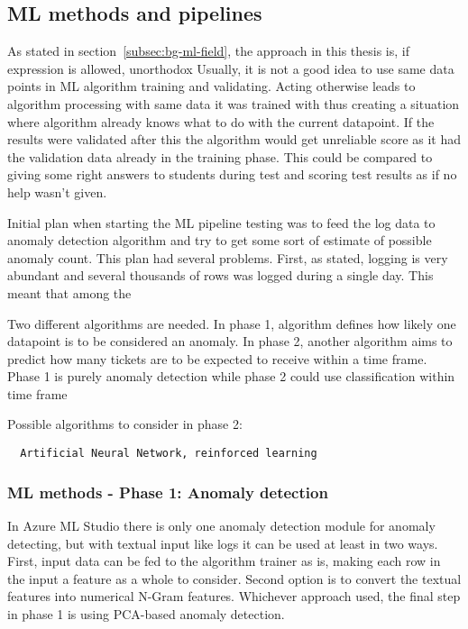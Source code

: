 \subsection{ML methods and pipelines}\label{subsec:meth-ml-pipelines}
As stated in section~\ref{subsec:bg-ml-field},
the approach in this thesis is,
if expression is allowed, unorthodox
Usually,
it is not a good idea to use
same data points in ML algorithm training and validating.
Acting otherwise
leads to algorithm processing with
same data it was trained with
thus creating a situation
where algorithm already knows what to do with the current datapoint.
If the results were validated after this
the algorithm would get unreliable score
as it had the validation data already in the training phase.
This could be compared to
giving some right answers to students
during test and scoring test results as if
no help wasn't given.



Initial plan when starting the ML pipeline testing
was to feed the log data to anomaly detection algorithm
and try to get some sort of estimate of possible anomaly count.
This plan had several problems.
First, as stated, logging is very abundant
and several thousands of rows was logged %
during a single day.
This meant that among the

Two different algorithms are needed.
In phase 1,
algorithm defines how likely one datapoint
is to be considered an anomaly.
In phase 2,
another algorithm aims to predict
how many tickets are to be expected to receive
within a time frame.
Phase 1 is purely anomaly detection
while phase 2 could use
classification within time frame

Possible algorithms to consider in phase 2:
\begin{verbatim}
  Artificial Neural Network, reinforced learning
\end{verbatim}

\subsubsection{ML methods - Phase 1: Anomaly detection}\label{meth-mlmeth1-anomaly-detection}
In Azure ML Studio
there is only one anomaly detection module
for anomaly detecting,
but with textual input like logs
it can be used at least in two ways.
First,
input data can be fed to
the algorithm trainer as is,
making each row in the input
a feature as a whole
to consider.
Second option is to
convert the textual features
into numerical N-Gram features.
Whichever approach used,
the final step in phase 1
is using PCA-based anomaly detection.


